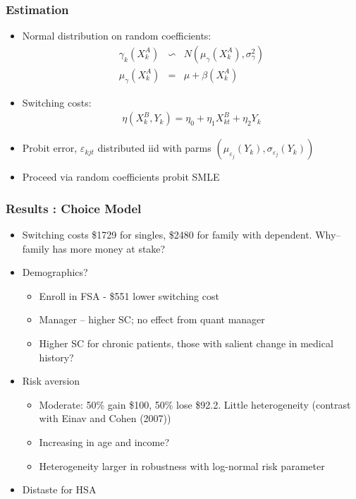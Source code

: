 
\begin{frame}
\frametitle{Estimation}

\begin{itemize}
\item Normal distribution on random coefficients:%
\begin{eqnarray*}
\gamma _{k}(X_{k}^{A}) &\backsim &N(\mu _{\gamma }(X_{k}^{A}),\sigma
_{\gamma }^{2}) \\
\mu _{\gamma }(X_{k}^{A}) &=&\mu +\beta (X_{k}^{A})
\end{eqnarray*}

\item Switching costs:%
\begin{align*}
\eta (X_{k}^{B},Y_{k})=\eta _{0}+\eta _{1}X_{kt}^{B}+\eta _{2}Y_{k}
\end{align*}

\item Probit error, $\varepsilon _{kjt}$ distributed iid with parms $(\mu
_{\varepsilon _{j}}(Y_{k}),\sigma _{\varepsilon _{j}}(Y_{k}))$

\item Proceed via random coefficients probit SMLE
\end{itemize}
\end{frame}

\begin{frame}
\frametitle{Results : Choice Model}

\begin{itemize}
\item Switching costs \$1729 for singles, \$2480 for family with dependent.
Why--family has more money at stake?

\item Demographics?

\begin{itemize}
\item Enroll in FSA - \$551 lower switching cost

\item Manager -- higher SC; no effect from quant manager

\item Higher SC for chronic patients, those with salient change in medical
history?
\end{itemize}

\item Risk aversion

\begin{itemize}
\item Moderate: 50\% gain \$100, 50\% lose \$92.2. Little heterogeneity
(contrast with Einav and Cohen (2007))

\item Increasing in age and income?

\item Heterogeneity larger in robustness with log-normal risk parameter
\end{itemize}

\item Distaste for HSA
\end{itemize}
\end{frame}

